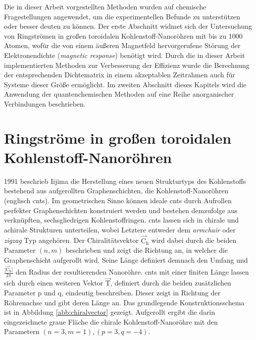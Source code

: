 Die in dieser Arbeit vorgestellten Methoden wurden auf chemische Fragestellungen angewendet, um die experimentellen Befunde zu unterstützen oder besser deuten zu können.
Der erste Abschnitt widmet sich der Untersuchung von Ringströmen in großen toroidalen Kohlenstoff-Nanoröhren mit bis zu 1000 Atomen, wofür die von einem äußeren Magnetfeld hervorgerufene Störung der Elektronendichte (\textit{magnetic response}) benötigt wird. Durch die in dieser Arbeit implementierten Methoden zur Verbesserung der Effizienz wurde die Berechnung der entsprechenden Dichtematrix in einem akzeptablen Zeitrahmen auch für Systeme dieser Größe ermöglicht. Im zweiten Abschnitt dieses Kapitels wird die Anwendung der quantenchemischen Methoden auf eine Reihe anorganischer Verbindungen beschrieben.  

\section{Ringströme in großen toroidalen Kohlenstoff-Nanoröhren}
1991 beschrieb Iijima\supercite{iijima1991helical} die Herstellung eines neuen Strukturtyps des Kohlenstoffs bestehend aus aufgerollten Graphenschichten, die Kohlenstoff-Nanoröhren (englisch \acp{cnt}). Im geometrischen Sinne können ideale \acp{cnt} durch Aufrollen perfekter Graphenschichten konstruiert werden und bestehen demzufolge aus verknüpften, sechsgliedrigen Kohlenstoffringen. \acp{cnt} lassen sich in chirale und achirale Strukturen unterteilen, wobei Letztere entweder dem \textit{armchair} oder \textit{zigzag} Typ angehören. Der Chiralitätsvektor $\vec{\text{C}}_\text{h}$ wird dabei durch die beiden Parameter $(n,m)$ beschrieben und zeigt die Richtung an, in welcher die Graphenschicht aufgerollt wird. Seine Länge definiert demnach den Umfang und $\frac{\vert\vec{\text{C}}_\text{h}\vert}{2\pi}$ den Radius der resultierenden Nanoröhre. \acp{cnt} mit einer finiten Länge lassen sich durch einen weiteren Vektor $\vec{\text{T}}$, definiert durch die beiden zusätzlichen Parameter p und q, eindeutig beschreiben. Dieser zeigt in Richtung der Röhrenachse und gibt deren Länge an. Das grundlegende Konstruktionsschema ist in Abbildung \ref{abb:chiralvector} gezeigt. Aufgerollt ergibt die darin eingezeichnete graue Fläche die chirale Kohlenstoff-Nanoröhre mit den Parametern $(n=3,m=1),(p=3,q=-4)$.
